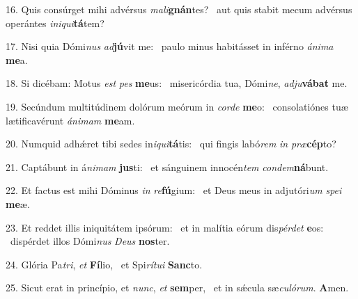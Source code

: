 16. Quis consúrget mihi advérsus \textit{ma}\textit{li}\textbf{gnán}tes? \ast\  aut quis stabit mecum advérsus operántes \textit{in}\textit{i}\textit{qui}\textbf{tá}tem?\

17. Nisi quia Dómi\textit{nus} \textit{ad}\textbf{jú}vit me: \ast\  paulo minus habitásset in inférno \textit{á}\textit{ni}\textit{ma} \textbf{me}a.\

18. Si dicébam: Motus \textit{est} \textit{pes} \textbf{me}us: \ast\  misericórdia tua, Dómi\textit{ne}, \textit{ad}\textit{ju}\textbf{vá}\textbf{bat} me.\

19. Secúndum multitúdinem dolórum meórum in \textit{cor}\textit{de} \textbf{me}o: \ast\  consolatiónes tuæ lætificavérunt \textit{á}\textit{ni}\textit{mam} \textbf{me}am.\

20. Numquid adhǽret tibi sedes in\textit{i}\textit{qui}\textbf{tá}tis: \ast\  qui fingis labó\textit{rem} \textit{in} \textit{præ}\textbf{cép}to?\

21. Captábunt in á\textit{ni}\textit{mam} \textbf{jus}ti: \ast\  et sánguinem innocén\textit{tem} \textit{con}\textit{dem}\textbf{ná}bunt.\

22. Et factus est mihi Dóminus \textit{in} \textit{re}\textbf{fú}gium: \ast\  et Deus meus in adjutóri\textit{um} \textit{spe}\textit{i} \textbf{me}æ.\

23. Et reddet illis iniquitátem ipsórum: \dag\  et in malítia eórum dis\textit{pér}\textit{det} \textbf{e}os: \ast\  dispérdet illos Dómi\textit{nus} \textit{De}\textit{us} \textbf{nos}ter.\

24. Glória Pa\textit{tri}, \textit{et} \textbf{Fí}lio, \ast\  et Spi\textit{rí}\textit{tu}\textit{i} \textbf{Sanc}to.\

25. Sicut erat in princípio, et \textit{nunc}, \textit{et} \textbf{sem}per, \ast\  et in sǽcula sæ\textit{cu}\textit{ló}\textit{rum}. \textbf{A}men.\

